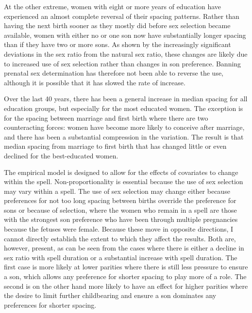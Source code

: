 \documentclass[12pt,letterpaper]{article}
\begin{document}
At the other extreme, women with eight or more years of education have
experienced an almost complete reversal of their spacing patterns.
Rather than having the next birth sooner as they mostly did before 
sex selection became available, women with either no or one son now 
have substantially longer spacing than if they have two or more sons.
As shown by the increasingly significant deviations in the sex ratio
from the natural sex ratio, these changes are likely due to increased
use of sex selection rather than changes in son preference. 
Banning prenatal sex determination has therefore not been able to
reverse the use, although it is possible that it has slowed the rate 
of increase.

Over the last 40 years, there has been a general increase in median
spacing for all education groups, but especially for the most 
educated women.
The exception is for the spacing between marriage and first birth
where there are two counteracting forces: women have become more likely 
to conceive after marriage, and there has been a substantial compression 
in the variation.
The result is that median spacing from marriage to first birth
that has changed little or even declined for the best-educated women.

The empirical model is designed to allow for the effects of covariates
to change within the spell. Non-proportionality is essential because the
use of sex selection may vary within a spell. The use of sex selection
may change either because preferences for not too long spacing between
births override the preference for sons or because of selection, where
the women who remain in a spell are those with the strongest son
preference who have been through multiple pregnancies because the
fetuses were female. Because these move in opposite directions, I cannot
directly establish the extent to which they affect the results. Both
are, however, present, as can be seen from the cases where there is
either a decline in sex ratio with spell duration or a substantial
increase with spell duration. The first case is more likely at lower
parities where there is still less pressure to ensure a son, which
allows any preference for shorter spacing to play more of a role. The
second is on the other hand more likely to have an effect for higher
parities where the desire to limit further childbearing and ensure a son
dominates any preferences for shorter spacing.
\end{document}
